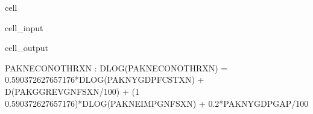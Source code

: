 \documentclass[letterpaper,10pt,english]{jupyterBook}
\begin{document}
\begin{sphinxuseclass}{cell}\begin{sphinxVerbatimInput}

\begin{sphinxuseclass}{cell_input}
\begin{sphinxVerbatim}[commandchars=\\\{\}]
\PYG{p}{[}\PYG{p}{]}
\end{sphinxVerbatim}

\end{sphinxuseclass}\end{sphinxVerbatimInput}
\begin{sphinxVerbatimOutput}

\begin{sphinxuseclass}{cell_output}
\begin{sphinxVerbatim}[commandchars=\\\{\}]
PAKNECONOTHRXN : DLOG(PAKNECONOTHRXN) = 0.590372627657176*DLOG(PAKNYGDPFCSTXN) + D(PAKGGREVGNFSXN/100) + (1 \PYGZhy{} 0.590372627657176)*DLOG(PAKNEIMPGNFSXN) + 0.2*PAKNYGDPGAP\PYGZus{}/100
\end{sphinxVerbatim}

\end{sphinxuseclass}\end{sphinxVerbatimOutput}

\end{sphinxuseclass}
\end{document}
